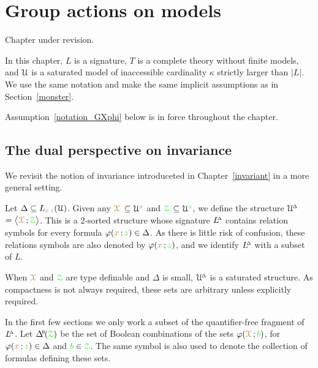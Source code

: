 \chapter{Group actions on models}
\label{actions}

\def\medrel#1{\parbox[t]{5ex}{$\displaystyle\hfil #1$}}
\def\ceq#1#2#3{\parbox[t]{17ex}{$\displaystyle #1$}\medrel{#2}{$\displaystyle #3$}}

\noindent\llap{\textcolor{red}{\Large\warning}\kern1.5ex}\ignorespaces
Chapter under revision.

In this chapter, $L$ is a signature, $T$ is a complete theory without finite models, and $\EuScript U$ is a saturated model of inaccessible cardinality $\kappa$ strictly larger than $|L|$.
We use the same notation and make the same implicit assumptions as in Section~\ref{monster}.

Assumption~\ref{notation_GXphi} below is in force throughout the chapter.

\section{The dual perspective on invariance}\label{dual_perspective}

We revisit the notion of invariance introduceted in Chapter~\ref{invariant} in a more general setting.

\begin{assumption}\label{notation_GXphi}
Let $\Delta\subseteq L_{{\color{brown} x}\,{\color{green} z}}(\EuScript U)$.
Given any \emph{${\color{brown}\EuScript X}$\/} $\subseteq\EuScript U^{\color{brown} x}$ and \emph{${\color{green}\EuScript Z}$\/} $\subseteq\EuScript U^{\color{green} z}$, we define the structure \emph{$\EuScript U\kern-.2ex^{\scriptscriptstyle\Delta}$\/} $=\big\langle{\color{brown}\EuScript X}\,;{\color{green}\EuScript Z}\big\rangle$.
This is a 2-sorted structure whose signature  \emph{$L\kern-.5ex^{\scriptscriptstyle\Delta}$\/} contains relation symbols for every formula $\varphi({\color{brown} x}\,;{\color{green} z})\in\Delta$.
As there is little risk of confusion, these relations symbols are also denoted by $\varphi({\color{brown} x}\,;{\color{green} z})$, and we identify $L\kern-.5ex^{\scriptscriptstyle\Delta}$ with a subset of $L$. 
\end{assumption}

When ${\color{brown}\EuScript X}$ and ${\color{green}\EuScript Z}$ are type definable and $\Delta$ is small, $\EuScript U\kern-.2ex^{\scriptscriptstyle\Delta}$ is a saturated structure.
As compactness is not always required, these sets are arbitrary unless explicitly required.

In the first few sections we only work a subset of the quantifier-free fragment of $L\kern-.5ex^{\scriptscriptstyle\Delta}$.
Let $\BDelta(\grZ)$ be the set of Boolean combinations of the sets $\varphi({\color{brown}\EuScript X}\,;{\color{green} b})$, for $\varphi({\color{brown} x}\,;{\color{green} z})\in\Delta$ and ${\color{green} b}\in{\color{green}\EuScript Z}$.
The same symbol is also used to denote the collection of formulas defining these sets.

